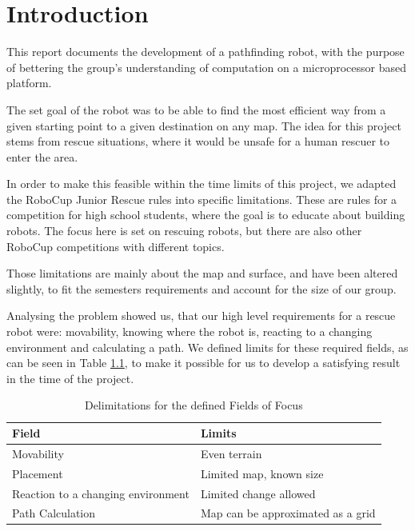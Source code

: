 \chapter{Introduction}\label{ch:introduction}

This report documents the development of a pathfinding robot,
with the purpose of bettering the group's understanding of computation on a microprocessor based platform.

The set goal of the robot was to be able to find the most efficient way
from a given starting point to a given destination on any map.
The idea for this project stems from rescue situations,
where it would be unsafe for a human rescuer to enter the area.

In order to make this feasible within the time limits of this project,
we adapted the RoboCup Junior Rescue rules \cite{Robocup} into specific limitations.
These are rules for a competition for high school students,
where the goal is to educate about building robots.
The focus here is set on rescuing robots,
but there are also other RoboCup competitions with different topics.

Those limitations are mainly about the map and surface,
and have been altered slightly,
to fit the semesters requirements and account for the size of our group.

Analysing the problem showed us,
that our high level requirements for a rescue robot were:
movability,
knowing where the robot is,
reacting to a changing environment and
calculating a path.
We defined limits for these required fields, as can be seen in Table \ref{tab:limits},
to make it possible for us to develop a satisfying result in the time of the project. 

\begin{table}[h]
\centering
\caption{Delimitations for the defined Fields of Focus}
\label{tab:limits}
\begin{tabular}{|l|l|}
	\hline%
	Field 				& Limits							\\
	\hline%
	Movability			& Even terrain						\\
	Placement			& Limited map, known size			\\
	Reaction to a changing environment	& Limited change allowed			\\
	Path Calculation	& Map can be approximated as a grid	\\
	\hline%
\end{tabular}
\end{table}

